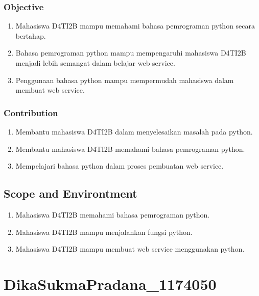 \subsubsection{Objective}
\begin{enumerate}
	\item Mahasiswa D4TI2B mampu memahami bahasa pemrograman python secara bertahap.
	\item Bahasa pemrograman python mampu mempengaruhi mahasiswa D4TI2B menjadi lebih semangat dalam belajar web service.
	\item Penggunaan bahasa python mampu mempermudah mahasiswa dalam membuat web service.
\end{enumerate}
\subsubsection{Contribution}
\begin{enumerate}
	\item Membantu mahasiswa D4TI2B dalam menyelesaikan masalah pada python.
	\item Membantu mahasiswa D4TI2B memahami bahasa pemrograman python.
	\item Mempelajari bahasa python dalam proses pembuatan web service.
\end{enumerate}
		
\subsection{Scope and Environtment}
\begin{enumerate}
	\item Mahasiswa D4TI2B memahami bahasa pemrograman python.
	\item Mahasiswa D4TI2B mampu menjalankan fungsi python.
	\item Mahasiswa D4TI2B mampu membuat web service menggunakan python.
\end{enumerate}

\section{DikaSukmaPradana_1174050}
